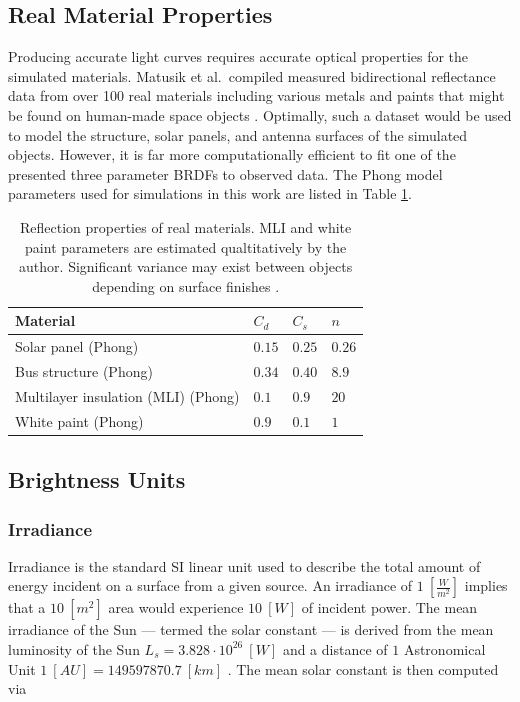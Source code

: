 \subsection{Real Material Properties}

Producing accurate light curves requires accurate optical properties for the simulated materials. Matusik et al.\ compiled measured bidirectional reflectance data from over 100 real materials including various metals and paints that might be found on human-made space objects \cite{matusik2003}. Optimally, such a dataset would be used to model the structure, solar panels, and antenna surfaces of the simulated objects. However, it is far more computationally efficient to fit one of the presented three parameter BRDFs to observed data. The Phong model parameters used for simulations in this work are listed in Table \ref{tb:real_matprops}.

\begin{table}[]
  \centering
  \begin{tabular}{|l|l|l|l|}
  \hline
  \textbf{Material} & $C_d$ & $C_s$ & $n$ \\ \hline
  Solar panel (Phong) \cite{fankhauser2023}              & $0.15$ & $0.25$ & $0.26$  \\ \hline
  Bus structure (Phong) \cite{fankhauser2023}               & $0.34$ & $0.40$ & $8.9$  \\ \hline
  Multilayer insulation (MLI) (Phong) & $0.1$ & $0.9$ & $20$ \\ \hline
  White paint (Phong) & $0.9$ & $0.1$ & $1$ \\ \hline
  \end{tabular}
  \caption{Reflection properties of real materials. MLI and white paint parameters are estimated qualtitatively by the author. Significant variance may exist between objects depending on surface finishes \cite{matusik2003}.}
  \label{tb:real_matprops}
\end{table}

\subsection{Brightness Units} \label{sec:brightness_units}

\subsubsection{Irradiance}

Irradiance is the standard SI linear unit used to describe the total amount of energy incident on a
surface from a given source. An irradiance of $1 \: \left[ \frac{W}{m^2} \right]$ implies that a $10
\: [m^2]$ area would experience $10 \: [W]$ of incident power. The mean irradiance of the Sun --- termed the solar constant --- is derived from the mean luminosity of the Sun $L_s = 3.828\cdot10^{26} \: [W]$ and a distance of $1$ Astronomical Unit $1 \: [AU] = 149597870.7 \: [km]$ \cite{frueh2019notes}. The mean solar constant is then computed via

